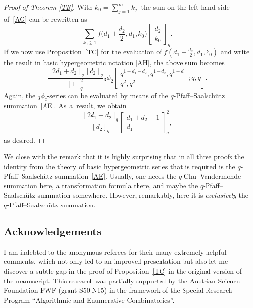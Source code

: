\documentclass[10pt,a4paper]{amsart}
\begin{document}
\begin{proof}[Proof of Theorem \ref{TB}]
With $k_0=\sum_{j=1}^mk_j$,
the sum on the left-hand side of~\eqref{AG} can be rewritten as
\begin{equation*}
\sum_{k_0\ge1}f\biggl(d_1+\frac {d_2} {2},d_1,k_0\biggr)
\begin{bmatrix} d_2\\k_0\end{bmatrix}_q.
\end{equation*}
If we now use Proposition~\ref{TC} for the evaluation of
$f(d_1+\tfrac {d_2} {2},d_1,k_0)$ and write the result
in basic hypergeometric notation \eqref{AH}, the above sum becomes
\begin{equation*}
\frac {[2d_1+d_2]_q\,[d_2]_q} {[1]_q^2}
   {}_3\phi _2\!\left [ \begin{matrix} q^{1+d_1+d_2},q^{1-d_2},q^{1-d_1}\\
q^{2},q^{2}
\end{matrix} ;q,q\right ].
\end{equation*}
Again, the $_3\phi_2$-series can be evaluated by means of the
$q$-Pfaff--Saalsch\"utz summation~\eqref{AE}. As~a~result, we obtain
\begin{equation*}
\frac {[2d_1+d_2]_q} {[d_2]_q}\begin{bmatrix} d_1+d_2-1\\d_1\end{bmatrix}_q^2,
\end{equation*}
as desired.
\end{proof}


We close with the remark that it is highly surprising that in all
three proofs the identity from the theory of basic hypergeometric
series that is required is the $q$-Pfaff--Saalsch\"utz
summation~\eqref{AE}. Usually, one needs the $q$-Chu--Vandermonde summation
here, a transformation formula there, and maybe the $q$-Pfaff--Saalsch\"utz
summation somewhere. However, remarkably, here it is {\it exclusively}
the $q$-Pfaff--Saalsch\"utz summation.

\subsection*{Acknowledgements}

I am indebted to the anonymous referees for their many extremely
helpful comments, which not only led to an improved presentation
but also let me discover a subtle gap in the proof of Proposition~\ref{TC}
in the original version of the manuscript.
This research was partially supported by the Austrian
Science Foundation FWF (grant S50-N15)
in the framework of the Special Research Program
``Algorithmic and Enumerative Combinatorics''.
\end{document}
